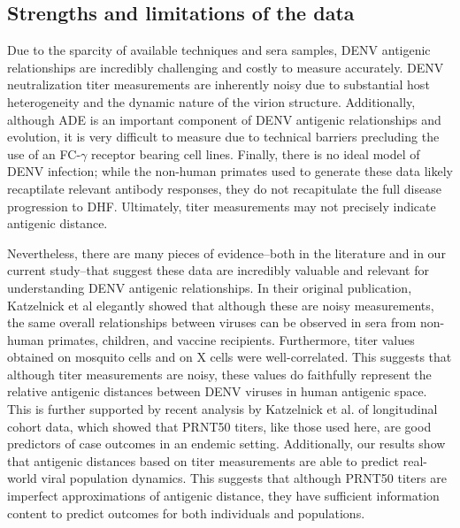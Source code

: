 \documentclass[11pt,oneside,letterpaper]{article}
\begin{document}
\subsection*{Strengths and limitations of the data}
Due to the sparcity of available techniques and sera samples, DENV antigenic relationships are incredibly challenging and costly to measure accurately.
DENV neutralization titer measurements are inherently noisy due to substantial host heterogeneity and the dynamic nature of the virion structure.
Additionally, although ADE is an important component of DENV antigenic relationships and evolution, it is very difficult to measure due to technical barriers precluding the use of an FC-$\gamma$ receptor bearing cell lines.
Finally, there is no ideal model of DENV infection; while the non-human primates used to generate these data likely recaptilate relevant antibody responses, they do not recapitulate the full disease progression to DHF.
Ultimately, titer measurements may not precisely indicate antigenic distance.

Nevertheless, there are many pieces of evidence--both in the literature and in our current study--that suggest these data are incredibly valuable and relevant for understanding DENV antigenic relationships.
In their original publication, Katzelnick et al elegantly showed that although these are noisy measurements, the same overall relationships between viruses can be observed in sera from non-human primates, children, and vaccine recipients.
Furthermore, titer values obtained on mosquito cells and on X cells were well-correlated.
This suggests that although titer measurements are noisy, these values do faithfully represent the relative antigenic distances between DENV viruses in human antigenic space.
This is further supported by recent analysis by Katzelnick et al. of longitudinal cohort data, which showed that PRNT50 titers, like those used here, are good predictors of case outcomes in an endemic setting.
Additionally, our results show that antigenic distances based on titer measurements are able to predict real-world viral population dynamics.
This suggests that although PRNT50 titers are imperfect approximations of antigenic distance, they have sufficient information content to predict outcomes for both individuals and populations.
\end{document}
